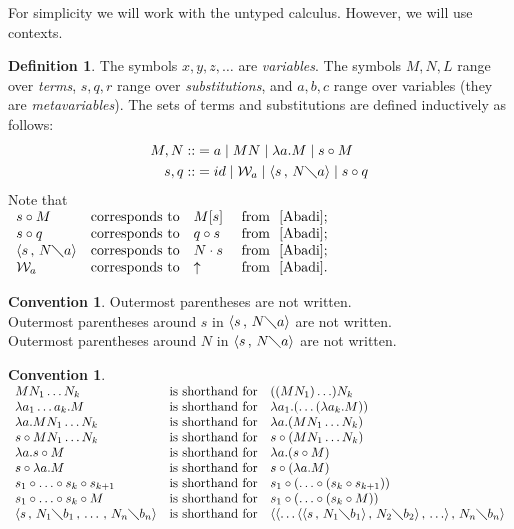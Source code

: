 \documentclass[11pt]{amsart}
\theoremstyle{plain}
\theoremstyle{definition}
\newtheorem{definition}[theorem]{Definition}
\newtheorem{convention}[theorem]{Convention}
\theoremstyle{remark}
\numberwithin{equation}{section}
\newcommand{\ci}{\circ}
\newcommand{\mi}{\,,\,}
\newcommand{\is}{\diagdown}
\newcommand{\la}{\langle}
\newcommand{\ra}{\rangle}
\newcommand{\x}{a}
\newcommand{\y}{b}
\newcommand{\z}{c}
\renewcommand{\pi}{\mathcal{W}}
\begin{document}
For simplicity  we  will work with  the untyped calculus. However,
we will use contexts.
\begin{definition}\label{pervoe} The symbols $x,y,z,\ldots$ are \emph{variables}. The symbols $M,N,L$ range over \emph{terms},
$s,q,r$  range over \emph{substitutions}, and $\x,\y,\z$  range
over variables (they are \emph{metavariables}). The sets of terms
and substitutions are defined inductively as follows:
\begin{align*}
M,N::&= \x \mid  MN \mid \lambda \x. M \mid s\ci M\\
s,q::&= id \mid \pi_{\x} \mid \langle s\mi  N\is \x \rangle \mid
s\ci q
\end{align*}
Note that\\[5pt]
 $\begin{array}{llll}
 s\ci M & \text{corresponds to} & M[s] &\text{ from ~\cite{Abadi}};\\
 s\ci q & \text{corresponds to} & q\ci s &\text{ from ~\cite{Abadi}};\\
\la s\mi N\is \x\ra & \text{corresponds to} & N\cdot s &\text{ from ~\cite{Abadi}};\\
\pi_{\x} & \text{corresponds to} & \uparrow &\text{ from
~\cite{Abadi}}.
   \end{array}$\\
   \end{definition}
   \begin{convention}\label{notation2}
 Outermost parentheses are not written.\\
  Outermost parentheses around $s$ in  $\la s\mi N\is
\x\ra$ are not written.\\
 Outermost parentheses around $N$ in  $\la s\mi N\is
\x\ra$ are not written.
 \end{convention}
\begin{convention}\label{notation1}$ $\\[3pt]
$\begin{array}{lll} MN_1\ldots  N_k & \text{is shorthand for} &
 ((MN_1)\ldots)N_k\\
 \lambda \x_1\ldots\x_k.M & \text{is shorthand for}
 & \lambda \x_1.(\ldots(\lambda \x_k.M))\\
 \lambda \x.MN_1\ldots N_k & \text{is shorthand for}
 & \lambda \x.(MN_1\ldots N_k)\\
s\ci MN_1\ldots N_k & \text{is shorthand for}
 & s\ci(MN_1\ldots N_k)\\
 \lambda \x.s\ci M & \text{is shorthand for}
 & \lambda \x.(s\ci M)\\
 s\ci \lambda \x.M & \text{is shorthand for}
 & s\ci(\lambda \x.M)\\
 s_1\ci\ldots\ci s_k\ci s_{k+1} & \text{is shorthand for}
 & s_1\ci(\ldots\ci(s_k\ci s_{k+1}))\\
 s_1\ci \ldots\ci s_k\ci M & \text{is shorthand for}
 & s_1\ci(\ldots\ci(s_k\ci M))\\
 \langle s\mi N_1\is \y_1\mi \ldots\mi N_n\is \y_n \rangle &
\text{is shorthand for} & \langle\langle\ldots\la\langle s\mi
N_1\is \y_1\rangle\mi
 N_2\is \y_2\rangle\mi\ldots\rangle\mi N_n\is \y_n\rangle
 \end{array}$
\end{convention}
\end{document}
